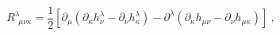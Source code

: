 \begin{equation}
R_{\ \ \mu \nu \kappa }^{\lambda }=\frac{1}{2}\left[ \partial _{\mu }\left(
\partial _{\kappa }h_{\nu }^{\lambda }-\partial _{\nu }h_{\kappa }^{\lambda
}\right) -\partial ^{\lambda }\left( \partial _{\kappa }h_{\mu \nu
}-\partial _{\nu }h_{\mu \kappa }\right) \right] \ ,
\end{equation}%
